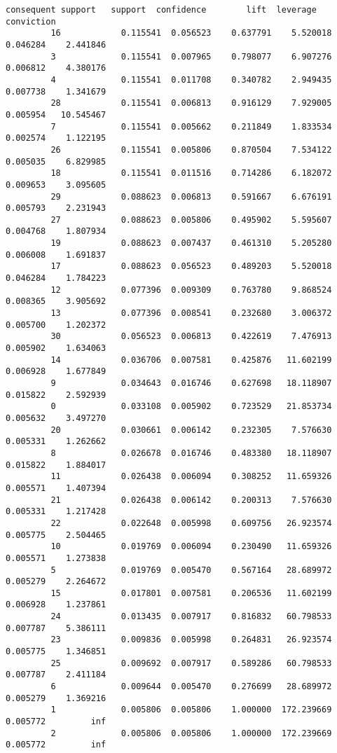 \documentclass[11pt]{article}
\begin{document}
\begin{Verbatim}[commandchars=\\\{\}]
             consequent support   support  confidence        lift  leverage  conviction  
         16            0.115541  0.056523    0.637791    5.520018  0.046284    2.441846  
         3             0.115541  0.007965    0.798077    6.907276  0.006812    4.380176  
         4             0.115541  0.011708    0.340782    2.949435  0.007738    1.341679  
         28            0.115541  0.006813    0.916129    7.929005  0.005954   10.545467  
         7             0.115541  0.005662    0.211849    1.833534  0.002574    1.122195  
         26            0.115541  0.005806    0.870504    7.534122  0.005035    6.829985  
         18            0.115541  0.011516    0.714286    6.182072  0.009653    3.095605  
         29            0.088623  0.006813    0.591667    6.676191  0.005793    2.231943  
         27            0.088623  0.005806    0.495902    5.595607  0.004768    1.807934  
         19            0.088623  0.007437    0.461310    5.205280  0.006008    1.691837  
         17            0.088623  0.056523    0.489203    5.520018  0.046284    1.784223  
         12            0.077396  0.009309    0.763780    9.868524  0.008365    3.905692  
         13            0.077396  0.008541    0.232680    3.006372  0.005700    1.202372  
         30            0.056523  0.006813    0.422619    7.476913  0.005902    1.634063  
         14            0.036706  0.007581    0.425876   11.602199  0.006928    1.677849  
         9             0.034643  0.016746    0.627698   18.118907  0.015822    2.592939  
         0             0.033108  0.005902    0.723529   21.853734  0.005632    3.497270  
         20            0.030661  0.006142    0.232305    7.576630  0.005331    1.262662  
         8             0.026678  0.016746    0.483380   18.118907  0.015822    1.884017  
         11            0.026438  0.006094    0.308252   11.659326  0.005571    1.407394  
         21            0.026438  0.006142    0.200313    7.576630  0.005331    1.217428  
         22            0.022648  0.005998    0.609756   26.923574  0.005775    2.504465  
         10            0.019769  0.006094    0.230490   11.659326  0.005571    1.273838  
         5             0.019769  0.005470    0.567164   28.689972  0.005279    2.264672  
         15            0.017801  0.007581    0.206536   11.602199  0.006928    1.237861  
         24            0.013435  0.007917    0.816832   60.798533  0.007787    5.386111  
         23            0.009836  0.005998    0.264831   26.923574  0.005775    1.346851  
         25            0.009692  0.007917    0.589286   60.798533  0.007787    2.411184  
         6             0.009644  0.005470    0.276699   28.689972  0.005279    1.369216  
         1             0.005806  0.005806    1.000000  172.239669  0.005772         inf  
         2             0.005806  0.005806    1.000000  172.239669  0.005772         inf  
\end{Verbatim}
            
\end{document}
